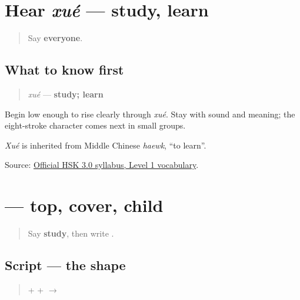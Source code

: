 \section[xué]{Hear \emph{xué} — study, learn}

\label{lesson:ZH-C13-hear-xue}



\begin{quote}
Say \textbf{everyone}.
\end{quote}

\subsection*{What to know first}
\begin{quote}
\emph{xué} — \textbf{study; learn}
\end{quote}

Begin low enough to rise clearly through \emph{xué}. Stay with sound and meaning; the eight-stroke character comes next in small groups.

\emph{Xué} is inherited from Middle Chinese \emph{haewk}, \textquotedblleft{}to learn\textquotedblright{}.

\begin{tcolorbox}[breakable,colback=teal!4,colframe=teal!35!black,title={Before you move on}]
Source: \href{https://hsk.cn-bj.ufileos.com/3.0/\%E6\%96\%B0\%E7\%89\%88HSK\%E8\%80\%83\%E8\%AF\%95\%E5\%A4\%A7\%E7\%BA\%B21219.pdf}{Official HSK 3.0 syllabus, Level 1 vocabulary}.
\end{tcolorbox}
\section[\texorpdfstring{\zh{学} (xué)}{学 (xué)}]{ — top, cover, child}

\label{lesson:ZH-W13-xue}



\begin{quote}
Say \textbf{study}, then write .
\end{quote}

\subsection*{Script — the shape}

\begin{quote}
\textbf{} + \textbf{} + \textbf{} $\to$ \textbf{}
\end{quote}


